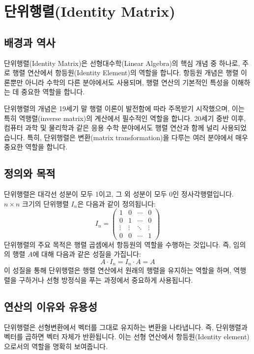 \section{단위행렬(Identity Matrix)}

\subsection{배경과 역사}
단위행렬(Identity Matrix)은 선형대수학(Linear Algebra)의 핵심 개념 중 하나로, 주로 행렬 연산에서 항등원(Identity Element)의 역할을 합니다. 항등원 개념은 행렬 이론뿐만 아니라 수학의 다른 분야에서도 사용되며, 행렬 연산의 기본적인 특성을 이해하는 데 중요한 역할을 합니다.

\noindent 단위행렬의 개념은 19세기 말 행렬 이론이 발전함에 따라 주목받기 시작했으며, 이는 특히 역행렬(inverse matrix)의 계산에서 필수적인 역할을 합니다. 20세기 중반 이후, 컴퓨터 과학 및 물리학과 같은 응용 수학 분야에서도 행렬 연산과 함께 널리 사용되었습니다. 특히, 단위행렬은 변환(matrix transformation)을 다루는 여러 분야에서 매우 중요한 역할을 합니다.

\subsection{정의와 목적}
단위행렬은 대각선 성분이 모두 1이고, 그 외 성분이 모두 0인 정사각행렬입니다. \(n \times n\) 크기의 단위행렬 \(I_n\)은 다음과 같이 정의됩니다:
\[
  I_n = \begin{pmatrix}
    1      & 0      & \cdots & 0      \\
    0      & 1      & \cdots & 0      \\
    \vdots & \vdots & \ddots & \vdots \\
    0      & 0      & \cdots & 1
  \end{pmatrix}
\]
단위행렬의 주요 목적은 행렬 곱셈에서 항등원의 역할을 수행하는 것입니다. 즉, 임의의 행렬 \(A\)에 대해 다음과 같은 성질을 가집니다:
\[
  A \cdot I_n = I_n \cdot A = A
\]
이 성질을 통해 단위행렬은 행렬 연산에서 원래의 행렬을 유지하는 역할을 하며, 역행렬을 구하거나 선형 방정식을 푸는 과정에서 중요하게 사용됩니다.

\subsection{연산의 이유와 유용성}
단위행렬은 선형변환에서 벡터를 그대로 유지하는 변환을 나타냅니다. 즉, 단위행렬과 벡터를 곱하면 벡터 자체가 반환됩니다. 이는 선형 연산에서 항등원(Identity element)으로서의 역할을 명확히 보여줍니다.

